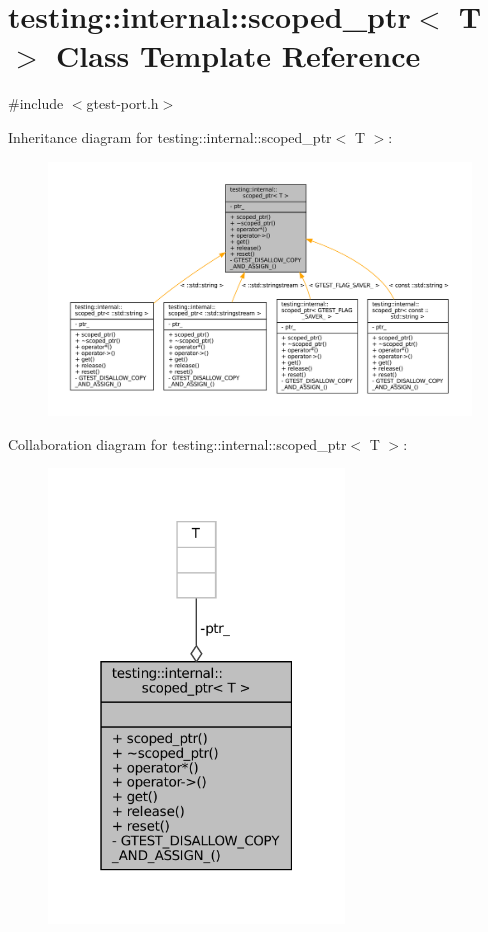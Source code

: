 \hypertarget{classtesting_1_1internal_1_1scoped__ptr}{}\section{testing\+:\+:internal\+:\+:scoped\+\_\+ptr$<$ T $>$ Class Template Reference}
\label{classtesting_1_1internal_1_1scoped__ptr}


{\ttfamily \#include $<$gtest-\/port.\+h$>$}



Inheritance diagram for testing\+:\+:internal\+:\+:scoped\+\_\+ptr$<$ T $>$\+:
\nopagebreak
\begin{figure}[H]
\begin{center}
\leavevmode
\includegraphics[width=350pt]{classtesting_1_1internal_1_1scoped__ptr__inherit__graph}
\end{center}
\end{figure}


Collaboration diagram for testing\+:\+:internal\+:\+:scoped\+\_\+ptr$<$ T $>$\+:
\nopagebreak
\begin{figure}[H]
\begin{center}
\leavevmode
\includegraphics[width=223pt]{classtesting_1_1internal_1_1scoped__ptr__coll__graph}
\end{center}
\end{figure}
